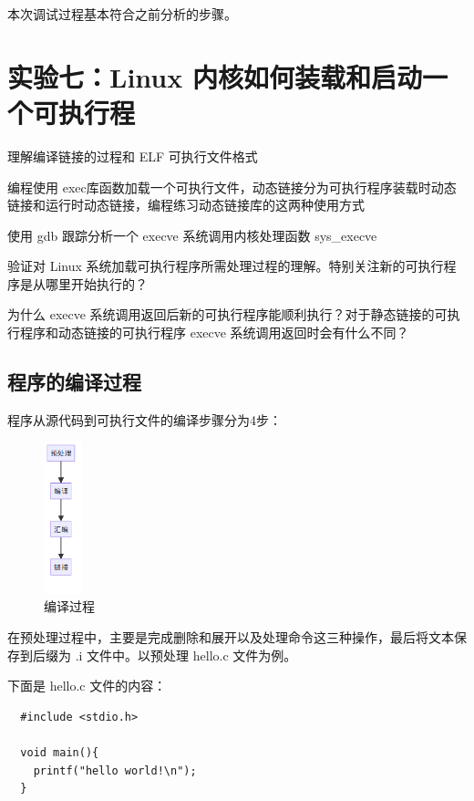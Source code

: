 \documentclass[lang=cn,10pt]{elegantbook}
\begin{document}
本次调试过程基本符合之前分析的步骤。

\chapter{实验七：Linux 内核如何装载和启动一个可执行程}

\begin{introduction}[实验要求:]
\item 理解编译链接的过程和 ELF 可执行文件格式
\item 编程使用 exec库函数加载一个可执行文件，动态链接分为可执行程序装载时动态链接和运行时动态链接，编程练习动态链接库的这两种使用方式
\item 使用 gdb 跟踪分析一个 execve 系统调用内核处理函数 sys\_execve
\item 验证对 Linux 系统加载可执行程序所需处理过程的理解。特别关注新的可执行程序是从哪里开始执行的？
\item 为什么 execve 系统调用返回后新的可执行程序能顺利执行？对于静态链接的可执行程序和动态链接的可执行程序 execve 系统调用返回时会有什么不同？
\end{introduction}

\section{程序的编译过程}
程序从源代码到可执行文件的编译步骤分为4步：
\begin{figure}[htbp]
  \centering
  \includegraphics[width=0.1\textwidth]{image/execve.png}
  \caption{编译过程}
\end{figure}


在预处理过程中，主要是完成删除和展开以及处理命令这三种操作，最后将文本保存到后缀为 .i 文件中。以预处理 hello.c 文件为例。

下面是 hello.c 文件的内容：
\begin{lstlisting}
  #include <stdio.h>
  
  void main(){
    printf("hello world!\n");
  }  
\end{lstlisting}
\end{document}
